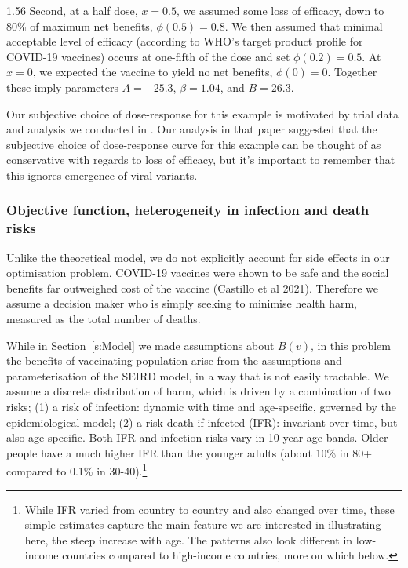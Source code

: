 \documentclass[12pt]{article}
\begin{document}
\begin{spacing}{1.56}
Second, at a half dose, $x=0.5$, we assumed some loss of efficacy, down to 80\% of maximum net benefits, $\phi(0.5)=0.8$. We then assumed that minimal acceptable level of efficacy (according to WHO's target product profile for COVID-19 vaccines) occurs at one-fifth of the dose and set $\phi(0.2) = 0.5$. At $x=0$, we expected the vaccine to yield no net benefits, $\phi(0)=0$.  Together these imply parameters $A=-25.3$, $\beta = 1.04$, and $B=26.3$. 

Our subjective choice of dose-response for this example is motivated by trial data and analysis we conducted in \cite{wiecek_pnas_2021}. Our analysis in that paper suggested that the subjective choice of dose-response curve for this example can be thought of as conservative with regards to loss of efficacy, but it's important to remember that this ignores emergence of viral variants.


\subsubsection{Objective function, heterogeneity in infection and death risks}

Unlike the theoretical model, we do not explicitly account for side effects in our optimisation problem. COVID-19 vaccines were shown to be safe and the social benefits far outweighed cost of the vaccine (Castillo et al 2021). Therefore we assume a decision maker who is simply seeking to minimise health harm, measured as the total number of deaths.

While in Section~\ref{s:Model} we made assumptions about $B(v)$, in this problem the benefits of vaccinating population arise from the assumptions and parameterisation of the SEIRD model, in a way that is not easily tractable. We assume a discrete distribution of harm, which is driven by a combination of two risks; (1) a risk of infection: dynamic with time and age-specific, governed by the epidemiological model; (2) a risk death if infected (IFR): invariant over time, but also age-specific. Both IFR and infection risks vary in 10-year age bands. Older people have a much higher IFR than the younger adults (about 10\% in 80+ compared to 0.1\% in 30-40).\footnote{While IFR varied from country to country and also changed over time, these simple estimates capture the main feature we are interested in illustrating here, the steep increase with age. The patterns also look different in low-income countries compared to high-income countries, more on which below.} 


\end{spacing}
\end{document}

